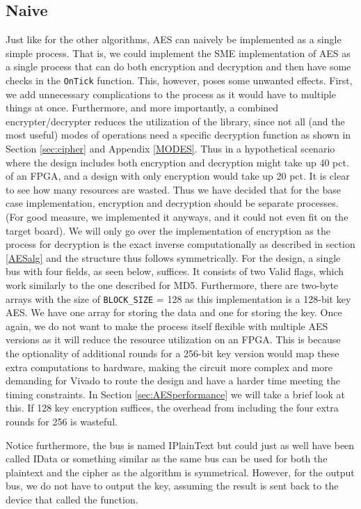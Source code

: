 \documentclass[a4paper, openany]{book}
\begin{document}
\subsection{Naive}
\label{AESnaive}
Just like for the other algorithms, AES can naively be implemented as a single simple process. That is, we could implement the SME implementation of AES as a single process that can do both encryption and decryption and then have some checks in the \texttt{OnTick} function. This, however, poses some unwanted effects. First, we add unnecessary complications to the process as it would have to multiple things at once. Furthermore, and more importantly, a combined encrypter/decrypter reduces the utilization of the library, since not all (and the most useful) modes of operations need a specific decryption function as shown in Section \ref{sec:cipher} and Appendix \ref{MODES}. Thus in a hypothetical scenario where the design includes both encryption and decryption might take up 40 pct. of an FPGA, and a design with only encryption would take up 20 pct. It is clear to see how many resources are wasted. Thus we have decided that for the base case implementation, encryption and decryption should be separate processes. (For good measure, we implemented it anyways, and it could not even fit on the target board). We will only go over the implementation of encryption as the process for decryption is the exact inverse computationally as described in section \ref{AESalg} and the structure thus follows symmetrically. For the design, a single bus with four fields, as seen below, suffices. It consists of two Valid flags, which work similarly to the one described for MD5.
Furthermore, there are two-byte arrays with the size of \texttt{BLOCK\_SIZE} = 128 as this implementation is a 128-bit key AES. We have one array for storing the data and one for storing the key. Once again, we do not want to make the process itself flexible with multiple AES versions as it will reduce the resource utilization on an FPGA. This is because the optionality of additional rounds for a 256-bit key version would map these extra computations to hardware, making the circuit more complex and more demanding for Vivado to route the design and have a harder time meeting the timing constraints. In Section \ref{sec:AESperformance} we will take a brief look at this. If 128 key encryption suffices, the overhead from including the four extra rounds for 256 is wasteful.

Notice furthermore, the bus is named IPlainText but could just as well have been called IData or something similar as the same bus can be used for both the plaintext and the cipher as the algorithm is symmetrical. However, for the output bus, we do not have to output the key, assuming the result is sent back to the device that called the function.
\end{document}
